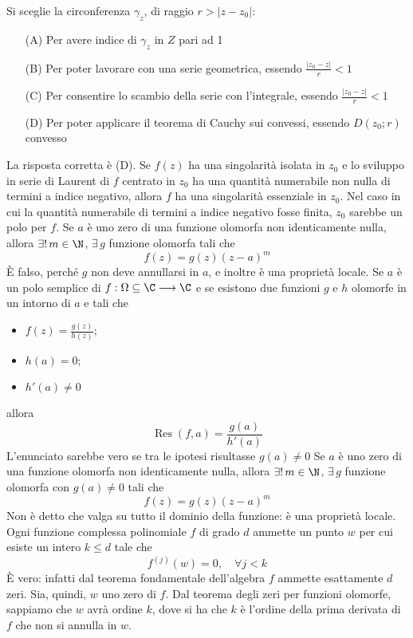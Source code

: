     Si sceglie la circonferenza $\gamma_z$, di raggio $r > |z - z_0|$: \begin{enumerate}
        \item[(A)] Per avere indice di $\gamma_z$ in $Z$ pari ad 1
        \item[(B)] Per poter lavorare con una serie geometrica, essendo $ \frac{|z_0 - z|}{r} < 1$
        \item[(C)] Per consentire lo scambio della serie con l'integrale, essendo $ \frac{|z_0 - z|}{r} < 1$
        \item[(D)] Per poter applicare il teorema di Cauchy sui convessi, essendo $D(z_0 ; r)$ convesso
    \end{enumerate}
    La risposta corretta è (D).
Se $f(z)$ ha una singolarità isolata in $z_0$ e lo sviluppo in serie di Laurent di $f$ centrato in $z_0$ ha una quantità numerabile non nulla di termini a indice negativo, allora $f$ ha una singolarità essenziale in $z_0$.
    Nel caso in cui la quantità numerabile di termini a indice negativo fosse finita, $z_0$ sarebbe un polo per $f$.
    Se $a$ è uno zero di una funzione olomorfa non identicamente nulla, allora $\exists!\, m \in \N$, $ \exists\, g$ funzione olomorfa tali che \[
        f(z) = g(z)(z-a)^m
    \]
    È falso, perché $ g $ non deve annullarsi in $ a $, e inoltre è una proprietà locale.
    Se $ a $ è un polo semplice di $ f: \Omega \subseteq \C \longrightarrow \C $ e se esistono due funzioni $ g $ e $ h $ olomorfe in un intorno di $ a $ e tali che \begin{itemize}
        \item $ \displaystyle f(z)=\frac{g(z)}{h(z)} $; 
        \item $ h(a)= 0 $; 
        \item $ h'(a)\neq 0 $
    \end{itemize}allora \[
        \operatorname{Res}(f,a) = \frac{g(a)}{h'(a)}
    \]
    L'enunciato sarebbe vero se tra le ipotesi risultasse $ g(a)\neq 0 $
    Se $a$ è uno zero di una funzione olomorfa non identicamente nulla, allora $\exists!\, m \in \N$, $ \exists\, g$ funzione olomorfa con $ g(a)\neq 0 $ tali che \[
        f(z) = g(z)(z-a)^m
    \]
    Non è detto che valga su tutto il dominio della funzione: è una proprietà locale. 
    Ogni funzione complessa polinomiale $f$ di grado $d$ ammette un punto $w$ per cui esiste un intero $k \le  d$ tale che \[
        f^{(j)}(w) = 0, \quad \forall j < k
    \]
    È vero: infatti dal teorema fondamentale dell'algebra $f$ ammette esattamente $d$ zeri. Sia, quindi, $w$ uno zero di $f$. Dal teorema degli zeri per funzioni olomorfe, sappiamo che $w$ avrà ordine $k$, dove si ha che $k$ è l'ordine della prima derivata di $f$ che non si annulla in $w$.

